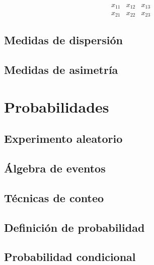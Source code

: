 \documentclass[10pt,]{krantz}
\theoremstyle{definition}
\theoremstyle{definition}
\theoremstyle{definition}
\theoremstyle{remark}
\begin{document}
\[\begin{array}{ccc}
x_{11} & x_{12} & x_{13}\\
x_{21} & x_{22} & x_{23}
\end{array}\]

\hypertarget{medidas-de-dispersiuxf3n}{%
\chapter{Medidas de dispersión}\label{medidas-de-dispersiuxf3n}}

\hypertarget{medidas-de-asimetruxeda}{%
\chapter{Medidas de asimetría}\label{medidas-de-asimetruxeda}}

\hypertarget{part-probabilidades}{%
\part{Probabilidades}\label{part-probabilidades}}

\hypertarget{experimento-aleatorio}{%
\chapter{Experimento aleatorio}\label{experimento-aleatorio}}

\hypertarget{uxe1lgebra-de-eventos}{%
\chapter{Álgebra de eventos}\label{uxe1lgebra-de-eventos}}

\hypertarget{tuxe9cnicas-de-conteo}{%
\chapter{Técnicas de conteo}\label{tuxe9cnicas-de-conteo}}

\hypertarget{definiciuxf3n-de-probabilidad}{%
\chapter{Definición de probabilidad}\label{definiciuxf3n-de-probabilidad}}

\hypertarget{probabilidad-condicional}{%
\chapter{Probabilidad condicional}\label{probabilidad-condicional}}
\end{document}
